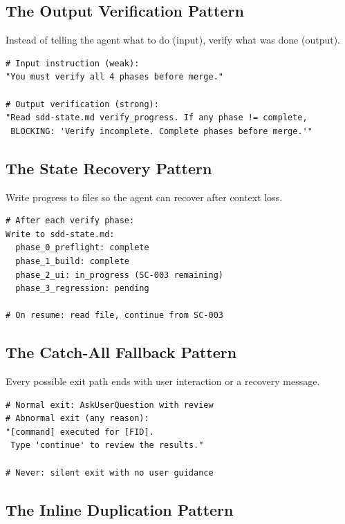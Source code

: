 \documentclass[11pt,a4paper,openright,twoside]{report}
\begin{document}
\subsection{The Output Verification Pattern}

Instead of telling the agent what to do (input), verify what was done (output).

\begin{lstlisting}[title={Output Verification Example}]
# Input instruction (weak):
"You must verify all 4 phases before merge."

# Output verification (strong):
"Read sdd-state.md verify_progress. If any phase != complete,
 BLOCKING: 'Verify incomplete. Complete phases before merge.'"
\end{lstlisting}

\subsection{The State Recovery Pattern}

Write progress to files so the agent can recover after context loss.

\begin{lstlisting}[title={State Recovery Example}]
# After each verify phase:
Write to sdd-state.md:
  phase_0_preflight: complete
  phase_1_build: complete
  phase_2_ui: in_progress (SC-003 remaining)
  phase_3_regression: pending

# On resume: read file, continue from SC-003
\end{lstlisting}

\subsection{The Catch-All Fallback Pattern}

Every possible exit path ends with user interaction or a recovery message.

\begin{lstlisting}[title={Catch-All Pattern}]
# Normal exit: AskUserQuestion with review
# Abnormal exit (any reason):
"[command] executed for [FID].
 Type 'continue' to review the results."

# Never: silent exit with no user guidance
\end{lstlisting}

\subsection{The Inline Duplication Pattern}
\end{document}
